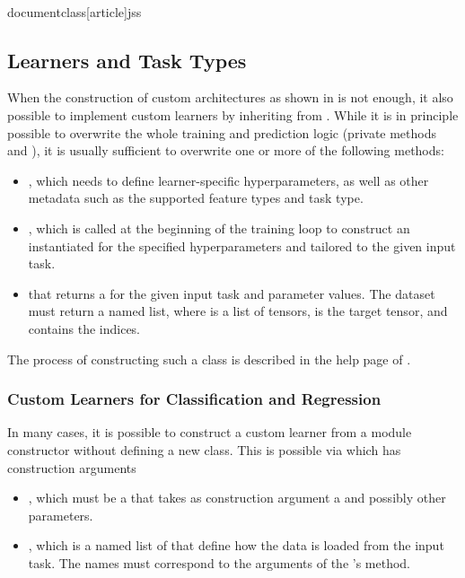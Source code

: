 \\documentclass[article]{jss}
\theoremstyle{definition}
\begin{document}
\subsection{Learners and Task Types}\label{sec:extending-learner-task}

When the construction of custom architectures as shown in  is not enough, it also possible to implement custom learners by inheriting from .
While it is in principle possible to overwrite the whole training and prediction logic (private methods  and ), it is usually sufficient to overwrite one or more of the following methods:
\begin{itemize}
    \item {}, which needs to define learner-specific hyperparameters, as well as other metadata such as the supported feature types and task type.
    \item {}, which is called at the beginning of the training loop to construct an instantiated  for the specified hyperparameters and tailored to the given input task.
    \item {} that returns a  for the given input task and parameter values. The dataset must return a named list, where  is a list of tensors,  is the target tensor, and  contains the indices.
\end{itemize}

The process of constructing such a class is described in the help page of .

\subsubsection{Custom Learners for Classification and Regression}\label{sec:extending-learner}

In many cases, it is possible to construct a custom learner from a module constructor without defining a new class.
This is possible via  which has construction arguments
\begin{itemize}
    \item {}, which must be a  that takes as construction argument a  and possibly other parameters.
    \item {}, which is a named list of  that define how the data is loaded from the input task. The names must correspond to the arguments of the 's  method.
\end{itemize}
\end{document}
